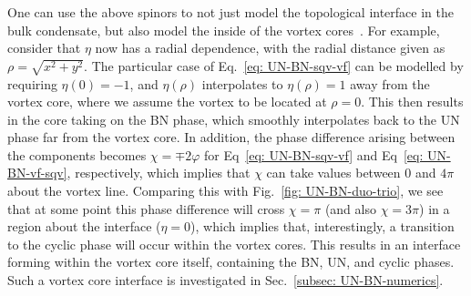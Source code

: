 One can use the above spinors to not just model the topological interface in the
bulk condensate, but also model the inside of the vortex
cores~\cite{Lovegrove2016, Weiss2019}.
For example, consider that \(\eta \) now has a radial dependence, with the
radial distance given as \(\rho = \sqrt{x^2 + y^2}\).
The particular case of Eq.~\eqref{eq: UN-BN-sqv-vf} can be modelled by requiring
\(\eta(0) = -1\), and \(\eta(\rho)\) interpolates to \(\eta(\rho) = 1\) away
from the vortex core, where we assume the vortex to be located at \(\rho = 0\).
This then results in the core taking on the BN phase, which smoothly
interpolates back to the UN phase far from the vortex core.
In addition, the phase difference arising between the components becomes
\(\chi = \mp 2\varphi \) for Eq~\eqref{eq: UN-BN-sqv-vf} and
Eq~\eqref{eq: UN-BN-vf-sqv}, respectively, which implies that \(\chi \) can take
values between 0 and \(4\pi \) about the vortex line.
Comparing this with Fig.~\ref{fig: UN-BN-duo-trio}, we see that at some point
this phase difference will cross \(\chi = \pi \) (and also \(\chi=3\pi \)) in a
region about the interface (\(\eta = 0\)), which implies that, interestingly, a
transition to the cyclic phase will occur within the vortex cores.
This results in an interface forming within the vortex core itself, containing
the BN, UN, and cyclic phases.
Such a vortex core interface is investigated in
Sec.~\ref{subsec: UN-BN-numerics}.

